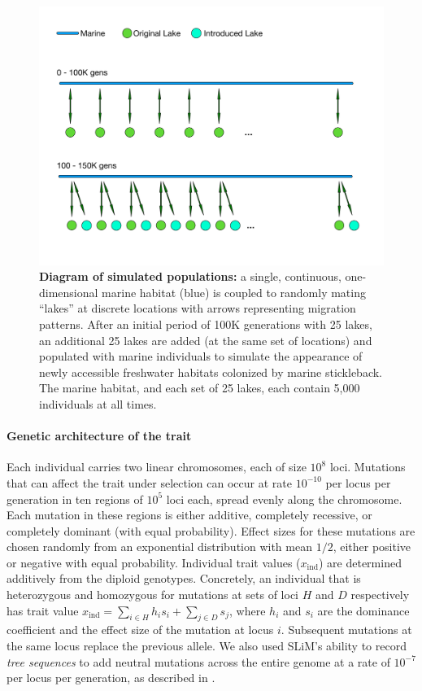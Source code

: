 \documentclass{article}
\begin{document}
\begin{figure}
    \begin{center}
          \includegraphics[width=0.6\linewidth]{GeographyFigure.pdf}
          \caption{
            \textbf{Diagram of simulated populations:}
            a single, continuous, one-dimensional marine habitat (blue)
            is coupled to randomly mating ``lakes'' at discrete locations with arrows representing migration patterns.
            After an initial period of 100K generations with 25 lakes,
            an additional 25 lakes are added (at the same set of locations) and populated with marine individuals
            to simulate the appearance of newly accessible freshwater habitats colonized by marine stickleback.
            The marine habitat, and each set of 25 lakes, each contain 5,000 individuals at all times.
            }
          \label{fig:Geo}
    \end{center}
\end{figure}

\paragraph{Genetic architecture of the trait}
Each individual carries two linear chromosomes, each of size $10^8$ loci.
Mutations that can affect the trait under selection can occur at rate $10^{-10}$ per locus per generation
in ten regions of $10^5$ loci each,
spread evenly along the chromosome.
Each mutation in these regions is either additive, completely recessive, or completely dominant (with equal probability). 
Effect sizes for these mutations are chosen randomly from an exponential distribution with mean $1/2$, either positive or negative with equal probability. 
Individual trait values ($x_\text{ind}$) are determined additively from the diploid genotypes. 
Concretely, an individual that is heterozygous and homozygous for mutations at sets of loci $H$ and $D$ respectively has trait value 
$x_\text{ind} = \sum_{i \in H} h_i s_i + \sum_{j \in D} s_j$, 
where $h_i$ and $s_i$ are the dominance coefficient and the effect size of the mutation at locus $i$.
Subsequent mutations at the same locus replace the previous allele.
We also used SLiM's ability to record \emph{tree sequences} \citep{haller2018treesequence}
to add neutral mutations across the entire genome at a rate of $10^{-7}$ per locus per generation, 
as described in \citet{kelleher2018efficient}.
\end{document}
